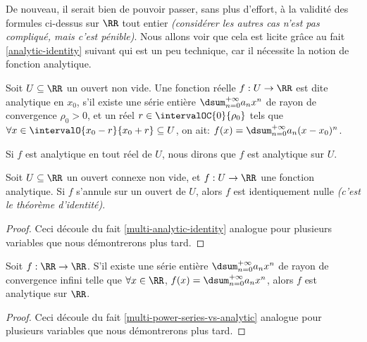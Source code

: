 De nouveau, il serait bien de pouvoir passer, sans plus d'effort, à la validité des formules ci-dessus sur $\RR$ tout entier \emph{(considérer les autres cas n'est pas compliqué, mais c'est pénible)}.
%
Nous allons voir que cela est licite grâce au fait \ref{analytic-identity} suivant qui est un peu technique, car il nécessite la notion de fonction analytique.


\begin{defi}
    Soit $U \subseteq \RR$ un ouvert non vide.
	Une fonction réelle $f: U \rightarrow \RR$ est dite analytique en $x_0$, 
	s'il existe
	une série entière $\dsum_{n = 0}^{+\infty} a_n x^n$
	de rayon de convergence $\rho_0 > 0$,
	et
	un réel $r \in \intervalOC{0}{\rho_0}$ tels que 
	$\forall x \in \intervalO{x_0 - r}{x_0 + r} \subseteq U$, on ait:
	$f(x) = \dsum_{n = 0}^{+\infty} a_n (x - x_0)^n$.

	Si $f$ est analytique en tout réel de $U$, nous dirons que $f$ est analytique sur $U$.
\end{defi}


\begin{fact} \label{analytic-identity}
    Soit $U \subseteq \RR$ un ouvert connexe non vide,
    et
    $f: U \rightarrow \RR$ une fonction analytique.
	Si $f$ s'annule sur un ouvert de $U$, alors $f$ est identiquement nulle
	\emph{(c'est le théorème d'identité)}.  
\end{fact}


\begin{proof}
	Ceci découle du fait \ref{multi-analytic-identity} analogue pour plusieurs variables que nous démontrerons plus tard.
\end{proof}


\begin{fact} \label{power-series-vs-analytic}
    Soit $f: \RR \rightarrow \RR$.
    S'il existe une série entière $\dsum_{n = 0}^{+\infty} a_n x^n$ de rayon de convergence infini
    telle que
	$\forall x \in \RR$, $f(x) = \dsum_{n = 0}^{+\infty} a_n x^n$,
	alors
	$f$ est analytique sur $\RR$. 
\end{fact}


\begin{proof}
	Ceci découle du fait \ref{multi-power-series-vs-analytic} analogue pour plusieurs variables que nous démontrerons plus tard.
\end{proof}


